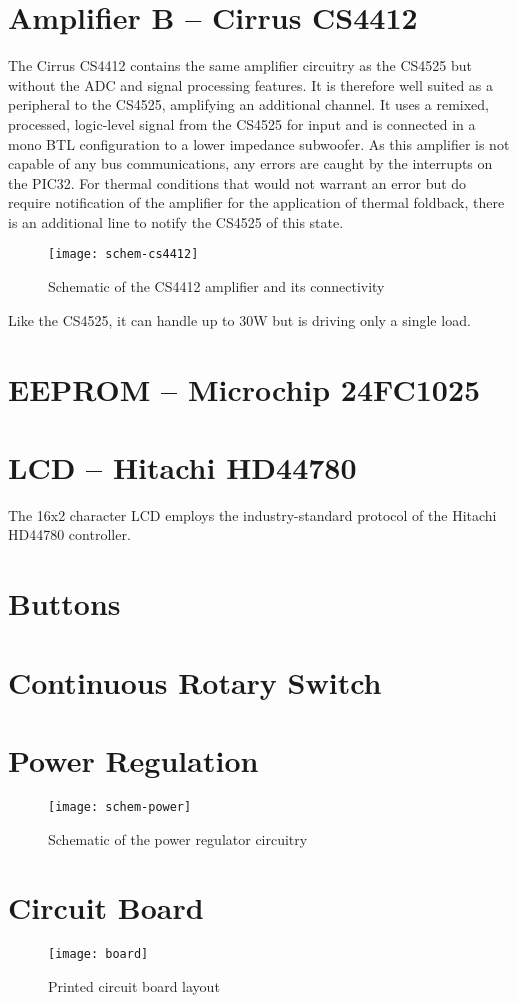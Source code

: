 \section{Amplifier B -- Cirrus CS4412}
The Cirrus CS4412 contains the same amplifier circuitry as the CS4525 but without the ADC and signal processing features. It is therefore well suited as a peripheral to the CS4525, amplifying an additional channel. It uses a remixed, processed, logic-level signal from the CS4525 for input and is connected in a mono BTL configuration to a lower impedance subwoofer. As this amplifier is not capable of any bus communications, any errors are caught by the interrupts on the PIC32. For thermal conditions that would not warrant an error but do require notification of the amplifier for the application of thermal foldback, there is an additional line to notify the CS4525 of this state.
\begin{figure}[H]
	\centering
	\texttt{[image: schem-cs4412]}
	\caption[Schematic -- Cirrus CS4412]%
	{Schematic of the CS4412 amplifier and its connectivity}
\end{figure}
Like the CS4525, it can handle up to 30W but is driving only a single load.

\section{EEPROM -- Microchip 24FC1025}

\section{LCD -- Hitachi HD44780}
The 16x2 character LCD employs the industry-standard protocol of the Hitachi HD44780 controller.

\section{Buttons}

\section{Continuous Rotary Switch}

\section{Power Regulation}
\begin{figure}[H]
	\centering
	\texttt{[image: schem-power]}
	\caption[Power Regulation]%
	{Schematic of the power regulator circuitry}
\end{figure}

\section{Circuit Board}
\begin{figure}[H]
	\centering
	\texttt{[image: board]}
	\caption[PCB Layout]%
	{Printed circuit board layout}
\end{figure}
